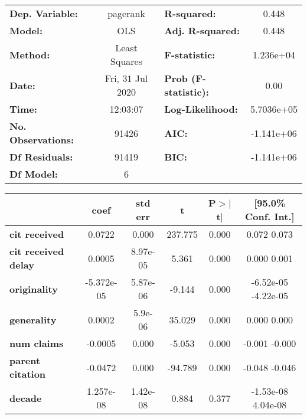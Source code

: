 \begin{center}
\begin{tabular}{lclc}
\toprule
\textbf{Dep. Variable:}     &     pagerank     & \textbf{  R-squared:         } &      0.448    \\
\textbf{Model:}             &       OLS        & \textbf{  Adj. R-squared:    } &      0.448    \\
\textbf{Method:}            &  Least Squares   & \textbf{  F-statistic:       } &  1.236e+04    \\
\textbf{Date:}              & Fri, 31 Jul 2020 & \textbf{  Prob (F-statistic):} &      0.00     \\
\textbf{Time:}              &     12:03:07     & \textbf{  Log-Likelihood:    } &  5.7036e+05   \\
\textbf{No. Observations:}  &       91426      & \textbf{  AIC:               } &  -1.141e+06   \\
\textbf{Df Residuals:}      &       91419      & \textbf{  BIC:               } &  -1.141e+06   \\
\textbf{Df Model:}          &           6      & \textbf{                     } &               \\
\bottomrule
\end{tabular}
\begin{tabular}{lccccc}
                            & \textbf{coef} & \textbf{std err} & \textbf{t} & \textbf{P$>$$|$t$|$} & \textbf{[95.0\% Conf. Int.]}  \\
\midrule
\textbf{cit received}       &       0.0722  &        0.000     &   237.775  &         0.000        &         0.072     0.073       \\
\textbf{cit received delay} &       0.0005  &     8.97e-05     &     5.361  &         0.000        &         0.000     0.001       \\
\textbf{originality}        &   -5.372e-05  &     5.87e-06     &    -9.144  &         0.000        &     -6.52e-05 -4.22e-05       \\
\textbf{generality}         &       0.0002  &      5.9e-06     &    35.029  &         0.000        &         0.000     0.000       \\
\textbf{num claims}         &      -0.0005  &        0.000     &    -5.053  &         0.000        &        -0.001    -0.000       \\
\textbf{parent citation}    &      -0.0472  &        0.000     &   -94.789  &         0.000        &        -0.048    -0.046       \\
\textbf{decade}             &    1.257e-08  &     1.42e-08     &     0.884  &         0.377        &     -1.53e-08  4.04e-08       \\

\end{tabular}
\end{center}
